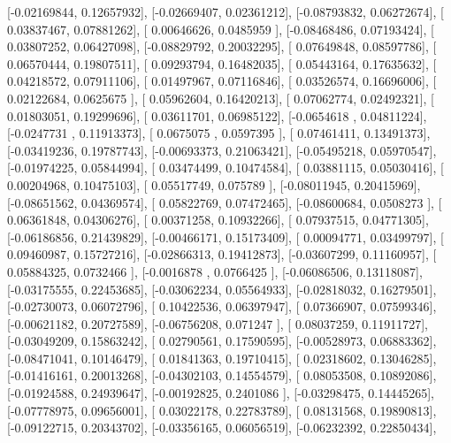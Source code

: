 \documentclass{article}
\begin{document}
       [-0.02169844,  0.12657932],
       [-0.02669407,  0.02361212],
       [-0.08793832,  0.06272674],
       [ 0.03837467,  0.07881262],
       [ 0.00646626,  0.0485959 ],
       [-0.08468486,  0.07193424],
       [ 0.03807252,  0.06427098],
       [-0.08829792,  0.20032295],
       [ 0.07649848,  0.08597786],
       [ 0.06570444,  0.19807511],
       [ 0.09293794,  0.16482035],
       [ 0.05443164,  0.17635632],
       [ 0.04218572,  0.07911106],
       [ 0.01497967,  0.07116846],
       [ 0.03526574,  0.16696006],
       [ 0.02122684,  0.0625675 ],
       [ 0.05962604,  0.16420213],
       [ 0.07062774,  0.02492321],
       [ 0.01803051,  0.19299696],
       [ 0.03611701,  0.06985122],
       [-0.0654618 ,  0.04811224],
       [-0.0247731 ,  0.11913373],
       [ 0.0675075 ,  0.0597395 ],
       [ 0.07461411,  0.13491373],
       [-0.03419236,  0.19787743],
       [-0.00693373,  0.21063421],
       [-0.05495218,  0.05970547],
       [-0.01974225,  0.05844994],
       [ 0.03474499,  0.10474584],
       [ 0.03881115,  0.05030416],
       [ 0.00204968,  0.10475103],
       [ 0.05517749,  0.075789  ],
       [-0.08011945,  0.20415969],
       [-0.08651562,  0.04369574],
       [ 0.05822769,  0.07472465],
       [-0.08600684,  0.0508273 ],
       [ 0.06361848,  0.04306276],
       [ 0.00371258,  0.10932266],
       [ 0.07937515,  0.04771305],
       [-0.06186856,  0.21439829],
       [-0.00466171,  0.15173409],
       [ 0.00094771,  0.03499797],
       [ 0.09460987,  0.15727216],
       [-0.02866313,  0.19412873],
       [-0.03607299,  0.11160957],
       [ 0.05884325,  0.0732466 ],
       [-0.0016878 ,  0.0766425 ],
       [-0.06086506,  0.13118087],
       [-0.03175555,  0.22453685],
       [-0.03062234,  0.05564933],
       [-0.02818032,  0.16279501],
       [-0.02730073,  0.06072796],
       [ 0.10422536,  0.06397947],
       [ 0.07366907,  0.07599346],
       [-0.00621182,  0.20727589],
       [-0.06756208,  0.071247  ],
       [ 0.08037259,  0.11911727],
       [-0.03049209,  0.15863242],
       [ 0.02790561,  0.17590595],
       [-0.00528973,  0.06883362],
       [-0.08471041,  0.10146479],
       [ 0.01841363,  0.19710415],
       [ 0.02318602,  0.13046285],
       [-0.01416161,  0.20013268],
       [-0.04302103,  0.14554579],
       [ 0.08053508,  0.10892086],
       [-0.01924588,  0.24939647],
       [-0.00192825,  0.2401086 ],
       [-0.03298475,  0.14445265],
       [-0.07778975,  0.09656001],
       [ 0.03022178,  0.22783789],
       [ 0.08131568,  0.19890813],
       [-0.09122715,  0.20343702],
       [-0.03356165,  0.06056519],
       [-0.06232392,  0.22850434],
\end{document}
